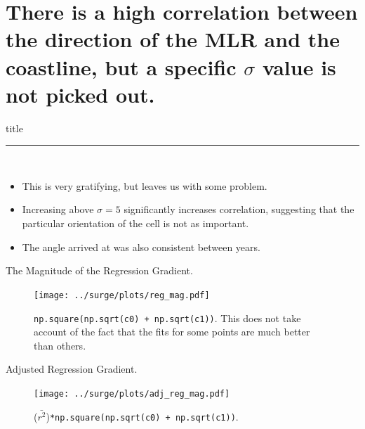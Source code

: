 \documentclass[usenames, dvipsnames]{beamer}
\begin{document}
\section{There is a high correlation between the direction of the MLR and the
 coastline, but a specific $\sigma$ value is not picked out. }
    \begin{frame}[plain]
        \vfill
      \centering
      \begin{beamercolorbox}[sep=8pt,center,shadow=true,rounded=true]{title}
        \insertsectionhead\par%
        \color{oxfordblue}\noindent\rule{10cm}{1pt} \\
        \begin{itemize}
        \item This is very gratifying, but leaves us with some problem.
        \item Increasing above $\sigma=5$ significantly increases correlation,
         suggesting that the particular orientation of the cell is not as important.
        \item The angle arrived at was also consistent between years.
        \end{itemize}
      \end{beamercolorbox}
      \vfill
  \end{frame}

\begin{frame}{The Magnitude of the  Regression Gradient.}
\vspace{-30pt}
\hspace{-30pt}
 \begin{minipage}{1.1\textwidth}
\begin{figure}[htb!]
    \centering
   \hspace{-40pt} \texttt{[image: ../surge/plots/reg\_mag.pdf]}
    \vspace{-15pt}
   \caption{\texttt{np.square(np.sqrt(c0) + np.sqrt(c1))}.
    This does not take account of the fact that the fits for some points are much better than others.}
    \label{fig:A}
\end{figure}
\end{minipage}
\end{frame}

\begin{frame}{Adjusted Regression Gradient.}
\vspace{-30pt}
\hspace{-30pt}
 \begin{minipage}{1.1\textwidth}
\begin{figure}[htb!]
    \centering
   \hspace{-40pt} \texttt{[image: ../surge/plots/adj\_reg\_mag.pdf]}
    \vspace{-15pt}
   \caption{($\bar{r^2}$)\texttt{*np.square(np.sqrt(c0) + np.sqrt(c1))}. }
    \label{fig:A}
\end{figure}
\end{minipage}
\end{frame}
\end{document}

